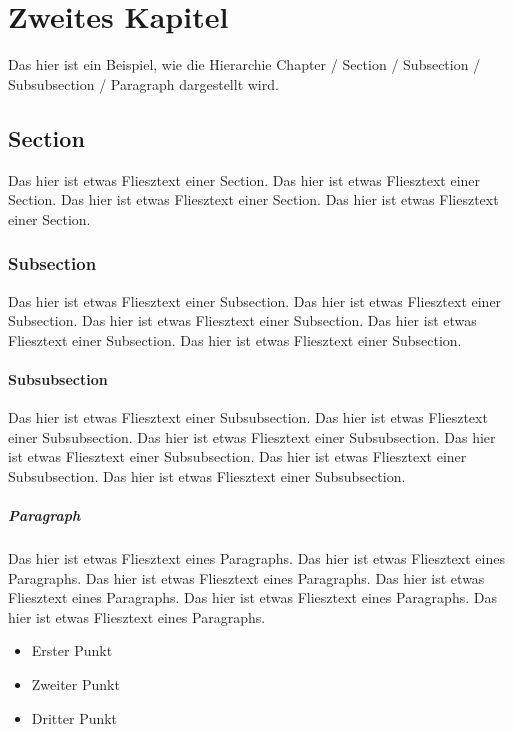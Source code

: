 \chapter{Zweites Kapitel}

Das hier ist ein Beispiel, wie die Hierarchie Chapter / Section / Subsection / Subsubsection / Paragraph dargestellt wird.

\section{Section}

Das hier ist etwas Fliesztext einer Section.
Das hier ist etwas Fliesztext einer Section.
Das hier ist etwas Fliesztext einer Section.
Das hier ist etwas Fliesztext einer Section.

\subsection{Subsection}

Das hier ist etwas Fliesztext einer Subsection.
Das hier ist etwas Fliesztext einer Subsection.
Das hier ist etwas Fliesztext einer Subsection.
Das hier ist etwas Fliesztext einer Subsection.
Das hier ist etwas Fliesztext einer Subsection.

\subsubsection{Subsubsection}

Das hier ist etwas Fliesztext einer Subsubsection.
Das hier ist etwas Fliesztext einer Subsubsection.
Das hier ist etwas Fliesztext einer Subsubsection.
Das hier ist etwas Fliesztext einer Subsubsection.
Das hier ist etwas Fliesztext einer Subsubsection.
Das hier ist etwas Fliesztext einer Subsubsection.

\paragraph{Paragraph}

Das hier ist etwas Fliesztext eines Paragraphs.
Das hier ist etwas Fliesztext eines Paragraphs.
Das hier ist etwas Fliesztext eines Paragraphs.
Das hier ist etwas Fliesztext eines Paragraphs.
Das hier ist etwas Fliesztext eines Paragraphs.
Das hier ist etwas Fliesztext eines Paragraphs.

\begin{itemize}
\item Erster Punkt
\item Zweiter Punkt
\item Dritter Punkt
\end{itemize}


